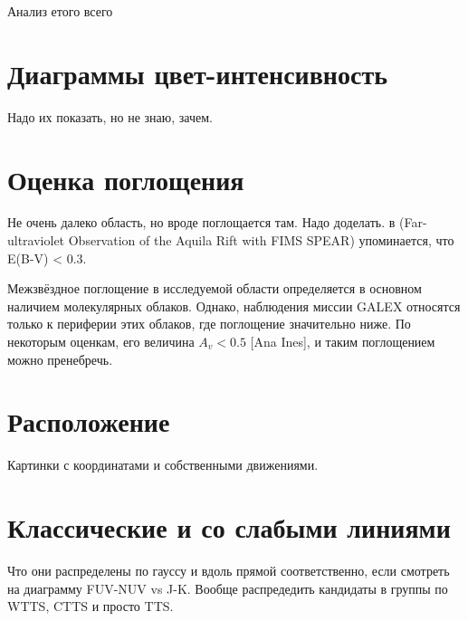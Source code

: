 Анализ етого всего

\section{Диаграммы цвет-интенсивность}
Надо их показать, но не знаю, зачем.

\section{Оценка поглощения}
Не очень далеко область, но вроде поглощается там. Надо доделать.
в (Far-ultraviolet Observation of the Aquila Rift with FIMS SPEAR) упоминается, что E(B-V) < 0.3.

Межзвёздное поглощение в исследуемой области определяется в основном наличием молекулярных облаков. Однако, наблюдения миссии GALEX относятся только к периферии этих облаков, где поглощение значительно ниже. По некоторым оценкам, его величина $A_v < 0.5$ [Ana Ines], и таким поглощением можно пренебречь.

\section{Расположение}
Картинки с координатами и собственными движениями.

\section{Классические и со слабыми линиями}
Что они распределены по гауссу и вдоль прямой соответственно, если смотреть на диаграмму FUV-NUV vs J-K. Вообще распредедить кандидаты в группы по WTTS, CTTS и просто TTS.
